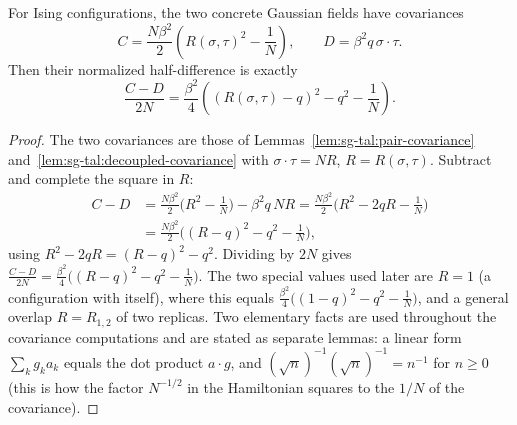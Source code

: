 \begin{lemma}
  \label{lem:sg-tal:path-covariance-algebra}
  \leanok
{}
For Ising configurations, the two concrete Gaussian fields have covariances
\[
C = \frac{N\beta^2}{2}\left(R(\sigma,\tau)^2 - \frac1N\right),
\qquad
D = \beta^2 q\, \sigma\mathbin{\cdot}\tau.
\]
Then their normalized half-difference is exactly
\[
\frac{C-D}{2N} = \frac{\beta^2}{4}
  \left((R(\sigma,\tau)-q)^2-q^2-\frac1N\right).
\]
\end{lemma}
\begin{proof}
  \leanok
The two covariances are those of Lemmas~\ref{lem:sg-tal:pair-covariance} and~\ref{lem:sg-tal:decoupled-covariance} with $\sigma\mathbin{\cdot}\tau=N R$, $R=R(\sigma,\tau)$. Subtract and complete the square in $R$:
\begin{align*}
C-D&=\frac{N\beta^2}{2}\Big(R^2-\frac1N\Big)-\beta^2 q\,N R
=\frac{N\beta^2}{2}\Big(R^2-2qR-\frac1N\Big)\\
&=\frac{N\beta^2}{2}\Big((R-q)^2-q^2-\frac1N\Big),
\end{align*}
using $R^2-2qR=(R-q)^2-q^2$. Dividing by $2N$ gives $\frac{C-D}{2N}=\frac{\beta^2}{4}\big((R-q)^2-q^2-\frac1N\big)$.
The two special values used later are $R=1$ (a configuration with itself), where this equals $\frac{\beta^2}{4}\big((1-q)^2-q^2-\frac1N\big)$, and a general overlap $R=R_{1,2}$ of two replicas.
Two elementary facts are used throughout the covariance computations and are stated as separate lemmas: a linear form $\sum_k g_k a_k$ equals the dot product $a\cdot g$, and $(\sqrt n)^{-1}(\sqrt n)^{-1}=n^{-1}$ for $n\ge0$ (this is how the factor $N^{-1/2}$ in the Hamiltonian squares to the $1/N$ of the covariance).
\end{proof}

